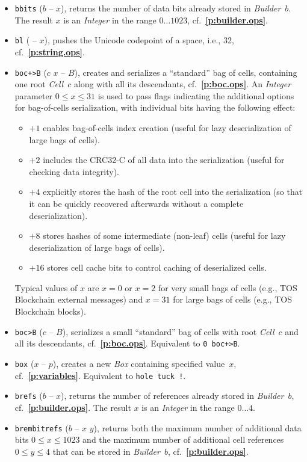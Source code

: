 \documentclass[12pt,oneside]{article}
\def\refpoint#1{{\rm\textbf{\ref{#1}}}}
\let\ptref=\refpoint
\begin{document}
\begin{itemize}
\item {\tt bbits} ($b$ -- $x$), returns the number of data bits already stored in {\em Builder\/}~$b$. The result $x$ is an {\em Integer\/} in the range $0\dots1023$, cf.~\ptref{p:builder.ops}.
\item {\tt bl} ( -- $x$), pushes the Unicode codepoint of a space, i.e., 32, cf.~\ptref{p:string.ops}.
\item {\tt boc+>B} ($c$ $x$ -- $B$), creates and serializes a ``standard'' bag of cells, containing one root {\em Cell\/}~$c$ along with all its descendants, cf.~\ptref{p:boc.ops}. An {\em Integer\/} parameter $0\leq x\leq 31$ is used to pass flags indicating the additional options for bag-of-cells serialization, with individual bits having the following effect:
  \begin{itemize}
  \item $+1$ enables bag-of-cells index creation (useful for lazy deserialization of large bags of cells).
  \item $+2$ includes the CRC32-C of all data into the serialization (useful for checking data integrity).
  \item $+4$ explicitly stores the hash of the root cell into the serialization (so that it can be quickly recovered afterwards without a complete deserialization).
  \item $+8$ stores hashes of some intermediate (non-leaf) cells (useful for lazy deserialization of large bags of cells).
  \item $+16$ stores cell cache bits to control caching of deserialized cells.
  \end{itemize}
Typical values of $x$ are $x=0$ or $x=2$ for very small bags of cells (e.g., TOS Blockchain external messages) and $x=31$ for large bags of cells (e.g., TOS Blockchain blocks).
\item {\tt boc>B} ($c$ -- $B$), serializes a small ``standard'' bag of cells with root {\em Cell\/}~$c$ and all its descendants, cf.~\ptref{p:boc.ops}. Equivalent to {\tt 0 boc+>B}.
\item {\tt box} ($x$ -- $p$), creates a new {\em Box\/} containing specified value~$x$, cf.~\ptref{p:variables}. Equivalent to {\tt hole tuck !}.
\item {\tt brefs} ($b$ -- $x$), returns the number of references already stored in {\em Builder\/}~$b$, cf.~\ptref{p:builder.ops}. The result $x$ is an {\em Integer\/} in the range $0\dots4$.
\item {\tt brembitrefs} ($b$ -- $x$ $y$), returns both the maximum number of additional data bits $0\leq x\leq 1023$ and the maximum number of additional cell references $0\leq y\leq 4$ that can be stored in {\em Builder\/}~$b$, cf.~\ptref{p:builder.ops}.

\end{itemize}
\end{document}
